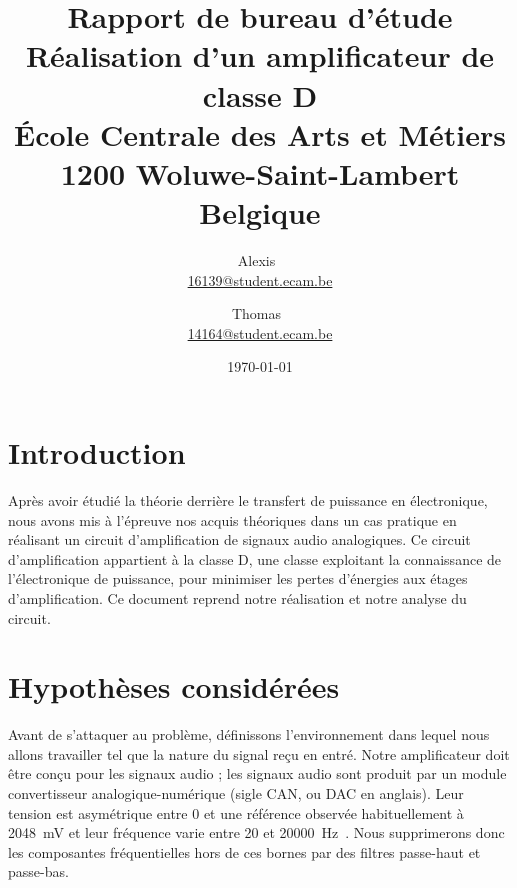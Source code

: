 \documentclass[10pt, oneside, a4paper]{article}
\begin{document}
\begin{titlepage}
    \date{%
        \today
    }
    \author{%
        Alexis~ \\
        \href{mailto:16139@student.ecam.be}{16139@student.ecam.be}
        \and
        Thomas~ \\
        \href{mailto:14164@student.ecam.be}{14164@student.ecam.be}
    }
    \title{%
        \color{gray}\LARGE\bfseries\sffamily
        Rapport de bureau d'étude                  \\[3mm]
        \rm\sffamily\large
        Réalisation d'un amplificateur de classe D \\[7mm]
        École Centrale des Arts et Métiers 		   \\
        1200 Woluwe-Saint-Lambert				   \\
        Belgique
    }
\end{titlepage}

\maketitle
\newpage


\tableofcontents


\newpage
\section*{Introduction}
Après avoir étudié la théorie derrière le transfert de puissance en électronique,
nous avons mis à l'épreuve nos acquis théoriques dans un cas pratique en réalisant un circuit d'amplification de signaux audio analogiques.
Ce circuit d'amplification appartient à la classe D, une classe exploitant la connaissance de l'électronique de puissance, pour minimiser les pertes d'énergies aux étages d'amplification.
Ce document reprend notre réalisation et notre analyse du circuit.


\section{Hypothèses considérées}
Avant de s'attaquer au problème, définissons l'environnement dans lequel nous allons travailler tel que la nature du signal reçu en entré.
Notre amplificateur doit être conçu pour les signaux audio ;
les signaux audio sont produit par un module convertisseur analogique-numérique (sigle CAN, ou DAC en anglais).
Leur tension est asymétrique entre \num{0} et une référence observée habituellement à \SI{2048}{\milli\volt} et leur fréquence varie entre \num{20} et \SI{20000}{\hertz}~\cite{heffner2007hearing}.
Nous supprimerons donc les composantes fréquentielles hors de ces bornes par des filtres passe-haut et passe-bas.
\end{document}
